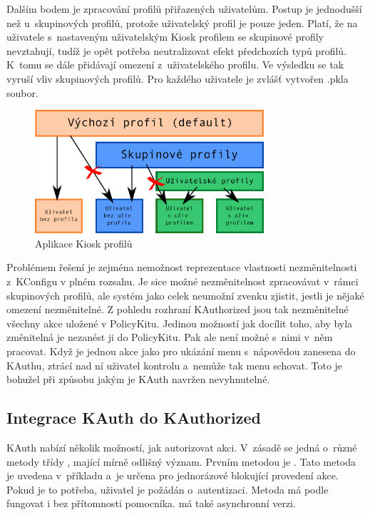 Dalším bodem je zpracování profilů přiřazených uživatelům. Postup je jednodušší než u~skupinových profilů, protože uživatelský profil je pouze jeden. Platí, že na uživatele s~nastaveným uživatelským Kiosk profilem se skupinové profily nevztahují, tudíž je opět potřeba neutralizovat efekt předchozích typů profilů. K~tomu se dále přidávají omezení z~uživatelského profilu. Ve výsledku se tak vyruší vliv skupinových profilů. Pro každého uživatele je zvlášť vytvořen .pkla soubor.

\begin{figure}[h]
    \centering
    \includegraphics[width=8.5cm]{obrazky/profily.pdf}
    \caption{Aplikace Kiosk profilů}
    \label{fig:konv_profily}
\end{figure}

Problémem řešení je zejména nemožnost reprezentace vlastnosti nezměnitelnosti z~KConfigu v plném rozsahu. Je sice možné nezměnitelnost zpracovávat v~rámci skupinových profilů, ale systém jako celek neumožní zvenku zjistit, jestli je nějaké omezení nezměnitelné. Z pohledu rozhraní KAuthorized jsou tak nezměnitelné všechny akce uložené v PolicyKitu. Jedinou možností jak docílit toho, aby byla změnitelná je nezanést ji do PolicyKitu. Pak ale není možné s~nimi v~něm pracovat. Když je jednou akce jako  pro ukázání menu s~nápovědou zanesena do KAuthu, ztrácí nad ní uživatel kontrolu a~nemůže tak menu schovat. Toto je bohužel při způsobu jakým je KAuth navržen nevyhnutelné.

\subsection*{Integrace KAuth do KAuthorized}
KAuth nabízí několik možností, jak autorizovat akci. V~zásadě se jedná o~různé metody třídy , mající mírně odlišný význam. Prvním metodou je . Tato metoda je uvedena v~příkladu \cite{Kauth-usage} a~je určena pro jednorázové blokující provedení akce. Pokud je to potřeba, uživatel je požádán o~autentizaci. Metoda má podle \cite{Kauth-usage} fungovat i bez přítomnosti pomocníka.  má také asynchronní verzi.

